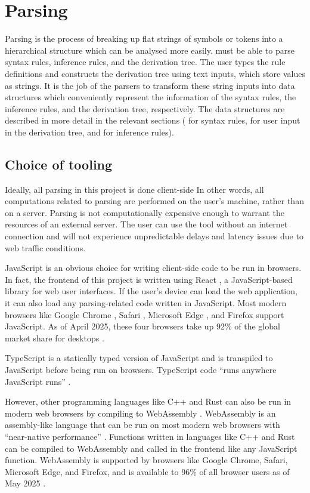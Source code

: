 \section{Parsing}
\label{background:parsing}
Parsing is the process of breaking up flat strings of symbols or tokens into a hierarchical structure which can be analysed more easily. \projectname{} must be able to parse syntax rules, inference rules, and the derivation tree. The user types the rule definitions and constructs the derivation tree using text inputs, which store values as strings. It is the job of the parsers to transform these string inputs into data structures which conveniently represent the information of the syntax rules, the inference rules, and the derivation tree, respectively. The data structures are described in more detail in the relevant sections ( for syntax rules,  for user input in the derivation tree, and  for inference rules).

\subsection{Choice of tooling}
Ideally, all parsing in this project is done client-side In other words, all computations related to parsing are performed on the user's machine, rather than on a server. Parsing is not computationally expensive enough to warrant the resources of an external server. The user can use the tool without an internet connection and will not experience unpredictable delays and latency issues due to web traffic conditions.

JavaScript \cite{javascript} is an obvious choice for writing client-side code to be run in browsers. In fact, the frontend of this project is written using React \cite{react}, a JavaScript-based library for web user interfaces. If the user's device can load the web application, it can also load any parsing-related code written in JavaScript. Most modern browsers like Google Chrome \cite{chrome}, Safari \cite{safari}, Microsoft Edge \cite{edge}, and Firefox \cite{firefox} support JavaScript. As of April 2025, these four browsers take up 92\% of the global market share for desktops \cite{statcounter}.

TypeScript \cite{typescript} is a statically typed version of JavaScript and is transpiled to JavaScript before being run on browsers. TypeScript code ``runs anywhere JavaScript runs'' \cite{typescript}.

However, other programming languages like C++ and Rust can also be run in modern web browsers by compiling to WebAssembly \cite{webassembly}. WebAssembly is an assembly-like language that can be run on most modern web browsers with ``near-native performance'' \cite{webassembly}. Functions written in languages like C++ and Rust can be compiled to WebAssembly and called in the frontend like any JavaScript function. WebAssembly is supported by browsers like Google Chrome, Safari, Microsoft Edge, and Firefox, and is available to 96\% of all browser users as of May 2025 \cite{webassembly:caniuse}.

